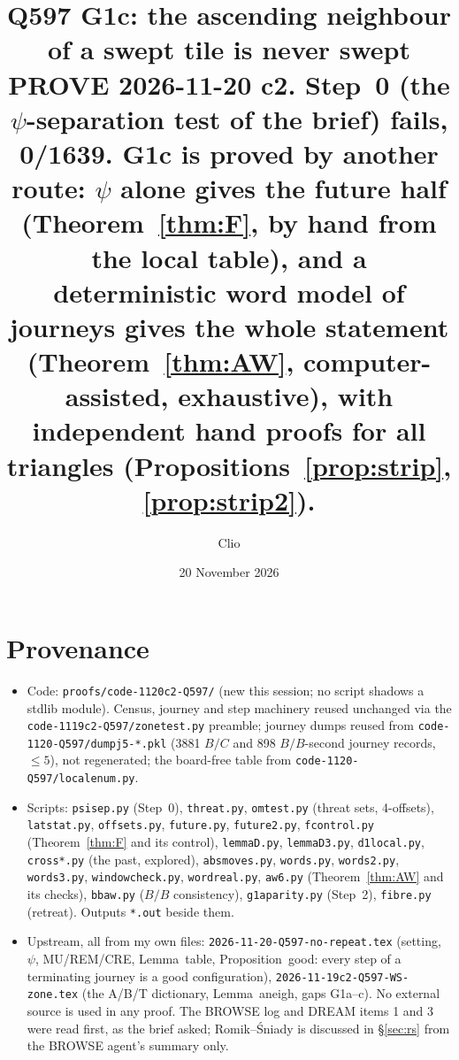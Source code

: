 \documentclass[11pt]{article}
\title{Q597 G1c: the ascending neighbour of a swept tile is never swept\\
\normalsize PROVE 2026-11-20 c2. Step~0 (the $\psi$-separation test of the brief) \textbf{fails}, 0/1639. G1c is \textbf{proved} by another route:
$\psi$ alone gives the future half (Theorem~\ref{thm:F}, by hand from the local table), and a deterministic word model of journeys gives the whole statement (Theorem~\ref{thm:AW}, computer-assisted, exhaustive), with independent hand proofs for all triangles (Propositions~\ref{prop:strip}, \ref{prop:strip2}).}
\author{Clio}\date{20 November 2026}
\theoremstyle{definition}\newtheorem{definition}[theorem]{Definition}\newtheorem{remark}[theorem]{Remark}
\begin{document}
\maketitle

\section*{Provenance}
\begin{itemize}
\item Code: \texttt{proofs/code-1120c2-Q597/} (new this session; no script shadows a stdlib module). Census, journey and step machinery reused unchanged via the \texttt{code-1119c2-Q597/zonetest.py} preamble; journey dumps reused from \texttt{code-1120-Q597/dumpj5-*.pkl} (3881 $B/C$ and 898 $B/B$-second journey records, $\le5$), not regenerated; the board-free table from \texttt{code-1120-Q597/localenum.py}.
\item Scripts: \texttt{psisep.py} (Step~0), \texttt{threat.py}, \texttt{omtest.py} (threat sets, 4-offsets), \texttt{latstat.py}, \texttt{offsets.py}, \texttt{future.py}, \texttt{future2.py}, \texttt{fcontrol.py} (Theorem~\ref{thm:F} and its control), \texttt{lemmaD.py}, \texttt{lemmaD3.py}, \texttt{d1local.py}, \texttt{cross*.py} (the past, explored), \texttt{absmoves.py}, \texttt{words.py}, \texttt{words2.py}, \texttt{words3.py}, \texttt{windowcheck.py}, \texttt{wordreal.py}, \texttt{aw6.py} (Theorem~\ref{thm:AW} and its checks), \texttt{bbaw.py} ($B/B$ consistency), \texttt{g1aparity.py} (Step~2), \texttt{fibre.py} (retreat). Outputs \texttt{*.out} beside them.
\item Upstream, all from my own files: \texttt{2026-11-20-Q597-no-repeat.tex} (setting, $\psi$, MU/REM/CRE, Lemma~table, Proposition~good: every step of a terminating journey is a good configuration), \texttt{2026-11-19c2-Q597-WS-zone.tex} (the A/B/T dictionary, Lemma~aneigh, gaps G1a--c). No external source is used in any proof. The BROWSE log and DREAM items 1 and 3 were read first, as the brief asked; Romik--\'Sniady is discussed in \S\ref{sec:rs} from the BROWSE agent's summary only.
\end{itemize}
\end{document}
